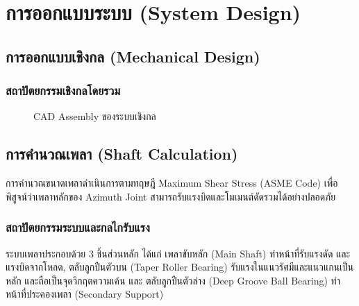 
\section{การออกแบบระบบ (System Design)}
\label{sec:system_design}

\subsection{การออกแบบเชิงกล (Mechanical Design)}
\label{subsec:mechanical_design}

\subsubsection{สถาปัตยกรรมเชิงกลโดยรวม}
\label{subsubsec:mechanical_architecture}

\begin{figure}[H]
  \centering
  \caption{CAD Assembly ของระบบเชิงกล}
  \label{fig:mech_cad}
\end{figure}

\subsection{การคำนวณเพลา (Shaft Calculation)}
\label{subsec:shaft_calc}

การคำนวณขนาดเพลาดำเนินการตามทฤษฎี
Maximum Shear Stress (ASME Code)
เพื่อพิสูจน์ว่าเพลาหลักของ Azimuth Joint
สามารถรับแรงบิดและโมเมนต์ดัดรวมได้อย่างปลอดภัย

\subsubsection{สถาปัตยกรรมระบบและกลไกรับแรง}

ระบบเพลาประกอบด้วย 3 ชิ้นส่วนหลัก ได้แก่
เพลาขับหลัก (Main Shaft) ทำหน้าที่รับแรงดัด
และแรงบิดจากโหลด,
ตลับลูกปืนตัวบน (Taper Roller Bearing)
รับแรงในแนวรัศมีและแนวแกนเป็นหลัก
และถือเป็นจุดวิกฤตความเค้น และ
ตลับลูกปืนตัวล่าง (Deep Groove Ball Bearing)
ทำหน้าที่ประคองเพลา (Secondary Support)

